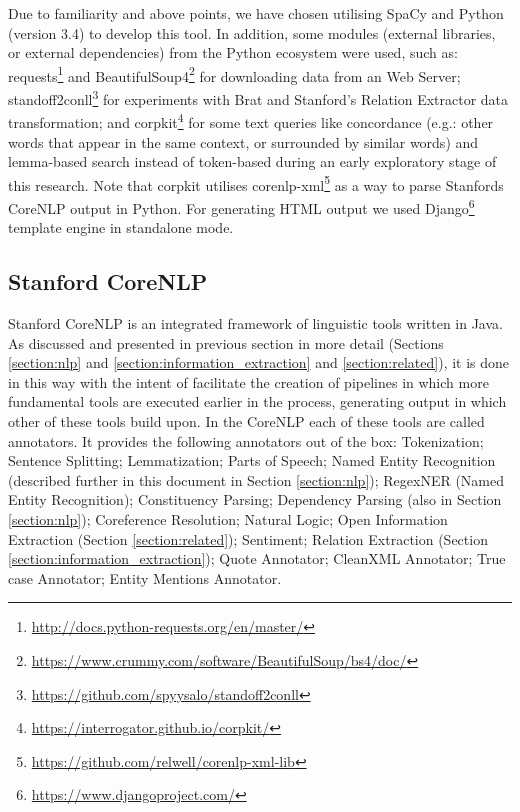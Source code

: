 \documentclass[11pt,a4paper,openright]{memoir}
\begin{document}
Due to familiarity and above points, we have chosen utilising SpaCy and Python (version 3.4) to develop this tool. In addition, some modules (external libraries, or external dependencies) from the Python ecosystem were used, such as: requests\footnote{\url{http://docs.python-requests.org/en/master/}} and BeautifulSoup4\footnote{\url{https://www.crummy.com/software/BeautifulSoup/bs4/doc/}} for downloading data from an Web Server; standoff2conll\footnote{\url{https://github.com/spyysalo/standoff2conll}} for experiments with Brat and Stanford's Relation Extractor data transformation; and corpkit\footnote{\url{https://interrogator.github.io/corpkit/}} for some text queries like concordance (e.g.: other words that appear in the same context, or surrounded by similar words) and lemma-based search instead of token-based during an early exploratory stage of this research. Note that corpkit utilises corenlp-xml\footnote{\url{https://github.com/relwell/corenlp-xml-lib}} as a way to parse Stanfords CoreNLP output in Python. For generating HTML output we used Django\footnote{\url{https://www.djangoproject.com/}} template engine in standalone mode.

\subsection{Stanford CoreNLP}

Stanford CoreNLP \cite{manning-EtAl:2014:P14-5} is an integrated framework of linguistic tools written in Java. As discussed and presented in previous section in more detail (Sections \ref{section:nlp} and \ref{section:information_extraction} and \ref{section:related}), it is done in this way with the intent of facilitate the creation of pipelines in which more fundamental tools are executed earlier in the process, generating output in which other of these tools build upon. In the CoreNLP each of these tools are called annotators. It provides the following annotators out of the box: Tokenization; Sentence Splitting; Lemmatization; Parts of Speech; Named Entity Recognition (described further in this document in Section \ref{section:nlp}); RegexNER (Named Entity Recognition); Constituency Parsing; Dependency Parsing (also in Section \ref{section:nlp}); Coreference Resolution; Natural Logic; Open Information Extraction (Section \ref{section:related}); Sentiment; Relation Extraction (Section \ref{section:information_extraction}); Quote Annotator; CleanXML Annotator; True case Annotator; Entity Mentions Annotator.
\end{document}
